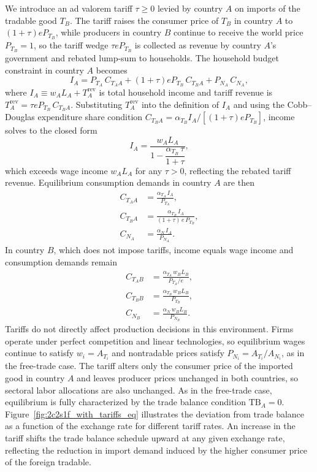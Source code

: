 \documentclass[11pt]{article}
\theoremstyle{plain}
\theoremstyle{remark}
\numberwithin{lemma}{section}
\numberwithin{proposition}{section}
\numberwithin{corollary}{section}
\begin{document}
We introduce an ad valorem tariff $\tau \ge 0$ levied by country $A$ on imports of the tradable good $T_B$. The tariff raises the consumer price of $T_B$ in country $A$ to $(1+\tau)e P_{T_B}$, while producers in country $B$ continue to receive the world price $P_{T_B} = 1$, so the tariff wedge $\tau e P_{T_B}$ is collected as revenue by country $A$'s government and rebated lump-sum to households. The household budget constraint in country $A$ becomes
\begin{equation}
I_A = P_{T_A}\, C_{T_A A} + (1+\tau)e P_{T_B}\, C_{T_B A} + P_{N_A}\, C_{N_A},
\end{equation}
where $I_A \equiv w_A L_A + T_A^{\mathrm{rev}}$ is total household income and tariff revenue is $T_A^{\mathrm{rev}} = \tau e P_{T_B}\, C_{T_B A}$. Substituting $T_A^{\mathrm{rev}}$ into the definition of $I_A$ and using the Cobb--Douglas expenditure share condition $C_{T_B A} = \alpha_{T_B} I_A / [(1+\tau)e P_{T_B}]$, income solves to the closed form
\begin{equation}
I_A = \frac{w_A L_A}{1 - \dfrac{\alpha_{T_B}\,\tau}{1+\tau}},
\label{eq:income_tariff}
\end{equation}
which exceeds wage income $w_A L_A$ for any $\tau > 0$, reflecting the rebated tariff revenue. Equilibrium consumption demands in country $A$ are then
\begin{align}
C_{T_A A} &= \frac{\alpha_{T_A}\, I_A}{P_{T_A}}, \\
C_{T_B A} &= \frac{\alpha_{T_B}\, I_A}{(1+\tau)\,e\,P_{T_B}}, \\
C_{N_A}   &= \frac{\alpha_N\, I_A}{P_{N_A}}.
\end{align}
In country $B$, which does not impose tariffs, income equals wage income and consumption demands remain
\begin{align}
C_{T_A B} &= \frac{\alpha_{T_A}\, w_B L_B}{P_{T_A}/e}, \\
C_{T_B B} &= \frac{\alpha_{T_B}\, w_B L_B}{P_{T_B}}, \\
C_{N_B}   &= \frac{\alpha_N\, w_B L_B}{P_{N_B}}.
\end{align}
Tariffs do not directly affect production decisions in this environment. Firms operate under perfect competition and linear technologies, so equilibrium wages continue to satisfy $w_i = A_{T_i}$ and nontradable prices satisfy $P_{N_i} = A_{T_i}/A_{N_i}$, as in the free-trade case. The tariff alters only the consumer price of the imported good in country $A$ and leaves producer prices unchanged in both countries, so sectoral labor allocations are also unchanged. As in the free-trade case, equilibrium is fully characterized by the trade balance condition $\mathrm{TB}_A = 0$. Figure~\ref{fig:2c2s1f_with_tariffs_eq} illustrates the deviation from trade balance as a function of the exchange rate for different tariff rates. An increase in the tariff shifts the trade balance schedule upward at any given exchange rate, reflecting the reduction in import demand induced by the higher consumer price of the foreign tradable.
\end{document}
